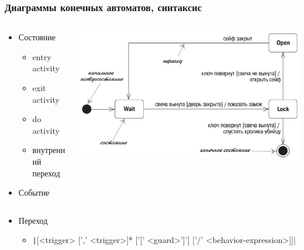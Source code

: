 \documentclass{../../slides-style}
\begin{document}
    \begin{frame}
        \frametitle{Диаграммы конечных автоматов, синтаксис}
        \begin{columns}
            \begin{column}{0.5\textwidth}
                \begin{itemize}
                    \item Состояние
                    \begin{itemize}
                        \item entry activity
                        \item exit activity
                        \item do activity
                        \item внутренний переход
                    \end{itemize}
                    \item Событие
                \end{itemize}
            \end{column}
            \begin{column}{0.5\textwidth}
                \begin{center}
                    \includegraphics[width=\textwidth]{stateTransitionSyntax.png}
                \end{center}
            \end{column}
        \end{columns}
        \begin{itemize}
            \item Переход
            \begin{itemize}
                \item \texttt|[<trigger> [',' <trigger>]* ['[' <guard>']'] ['/' <behavior-expression>]]|
            \end{itemize}
        \end{itemize}
    \end{frame}
\end{document}
